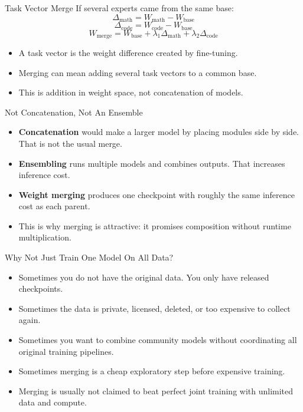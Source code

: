 \documentclass[aspectratio=169]{beamer}
\begin{document}
\begin{frame}{Task Vector Merge}
\small
If several experts came from the same base:
\[
\Delta_{\mathrm{math}}=W_{\mathrm{math}}-W_{\mathrm{base}}
\]
\[
\Delta_{\mathrm{code}}=W_{\mathrm{code}}-W_{\mathrm{base}}
\]
\[
W_{\mathrm{merge}}=W_{\mathrm{base}}+\lambda_1\Delta_{\mathrm{math}}+\lambda_2\Delta_{\mathrm{code}}
\]
\begin{itemize}
  \item A task vector is the weight difference created by fine-tuning.
  \item Merging can mean adding several task vectors to a common base.
  \item This is addition in weight space, not concatenation of models.
\end{itemize}

\end{frame}

\begin{frame}{Not Concatenation, Not An Ensemble}
\small
\begin{itemize}
  \item \textbf{Concatenation} would make a larger model by placing modules side by side. That is not the usual merge.
  \item \textbf{Ensembling} runs multiple models and combines outputs. That increases inference cost.
  \item \textbf{Weight merging} produces one checkpoint with roughly the same inference cost as each parent.
  \item This is why merging is attractive: it promises composition without runtime multiplication.
\end{itemize}
\end{frame}

\begin{frame}{Why Not Just Train One Model On All Data?}
\small
\begin{itemize}
  \item Sometimes you do not have the original data. You only have released checkpoints.
  \item Sometimes the data is private, licensed, deleted, or too expensive to collect again.
  \item Sometimes you want to combine community models without coordinating all original training pipelines.
  \item Sometimes merging is a cheap exploratory step before expensive training.
  \item Merging is usually not claimed to beat perfect joint training with unlimited data and compute.
\end{itemize}
\end{frame}
\end{document}
